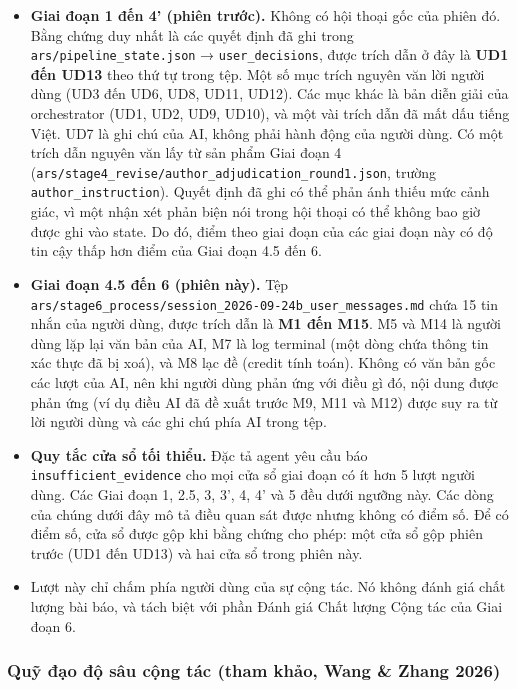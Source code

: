 \documentclass[12pt,a4paper]{article}
\providecommand{\tightlist}{\setlength{\itemsep}{0pt}\setlength{\parskip}{0pt}}
\begin{document}
\begin{itemize}
\tightlist
\item
  \textbf{Giai đoạn 1 đến 4' (phiên trước).} Không có hội thoại gốc của
  phiên đó. Bằng chứng duy nhất là các quyết định đã ghi trong
  \texttt{ars/pipeline\_state.json} → \texttt{user\_decisions}, được
  trích dẫn ở đây là \textbf{UD1 đến UD13} theo thứ tự trong tệp. Một số
  mục trích nguyên văn lời người dùng (UD3 đến UD6, UD8, UD11, UD12).
  Các mục khác là bản diễn giải của orchestrator (UD1, UD2, UD9, UD10),
  và một vài trích dẫn đã mất dấu tiếng Việt. UD7 là ghi chú của AI,
  không phải hành động của người dùng. Có một trích dẫn nguyên văn lấy
  từ sản phẩm Giai đoạn 4
  (\texttt{ars/stage4\_revise/author\_adjudication\_round1.json}, trường
  \texttt{author\_instruction}). Quyết định đã ghi có thể phản ánh thiếu
  mức cảnh giác, vì một nhận xét phản biện nói trong hội thoại có thể
  không bao giờ được ghi vào state. Do đó, điểm theo giai đoạn của các
  giai đoạn này có độ tin cậy thấp hơn điểm của Giai đoạn 4.5 đến 6.
\item
  \textbf{Giai đoạn 4.5 đến 6 (phiên này).} Tệp
  \texttt{ars/stage6\_process/session\_2026-09-24b\_user\_messages.md}
  chứa 15 tin nhắn của người dùng, được trích dẫn là \textbf{M1 đến
  M15}. M5 và M14 là người dùng lặp lại văn bản của AI, M7 là log
  terminal (một dòng chứa thông tin xác thực đã bị xoá), và M8 lạc đề
  (credit tính toán). Không có văn bản gốc các lượt của AI, nên khi
  người dùng phản ứng với điều gì đó, nội dung được phản ứng (ví dụ điều
  AI đã đề xuất trước M9, M11 và M12) được suy ra từ lời người dùng và
  các ghi chú phía AI trong tệp.
\item
  \textbf{Quy tắc cửa sổ tối thiểu.} Đặc tả agent yêu cầu báo
  \texttt{insufficient\_evidence} cho mọi cửa sổ giai đoạn có ít hơn 5
  lượt người dùng. Các Giai đoạn 1, 2.5, 3, 3', 4, 4' và 5 đều dưới
  ngưỡng này. Các dòng của chúng dưới đây mô tả điều quan sát được nhưng
  không có điểm số. Để có điểm số, cửa sổ được gộp khi bằng chứng cho
  phép: một cửa sổ gộp phiên trước (UD1 đến UD13) và hai cửa sổ trong
  phiên này.
\item
  Lượt này chỉ chấm phía người dùng của sự cộng tác. Nó không đánh giá
  chất lượng bài báo, và tách biệt với phần Đánh giá Chất lượng Cộng tác
  của Giai đoạn 6.
\end{itemize}

\hypertarget{quux1ef9-ux111ux1ea1o-ux111ux1ed9-suxe2u-cux1ed9ng-tuxe1c-tham-khux1ea3o-wang-zhang-2026}{%
\subsubsection{Quỹ đạo độ sâu cộng tác (tham khảo, Wang \& Zhang
2026)}\label{quux1ef9-ux111ux1ea1o-ux111ux1ed9-suxe2u-cux1ed9ng-tuxe1c-tham-khux1ea3o-wang-zhang-2026}}
\end{document}
